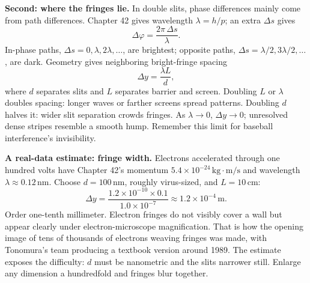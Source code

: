 \textbf{Second: where the fringes lie.} In double slits, phase differences mainly come from path differences. Chapter 42 gives wavelength \(\lambda = h/p\); an extra \(\Delta s\) gives
\[
\Delta\varphi = \frac{2\pi\,\Delta s}{\lambda}.
\]
In-phase paths, \(\Delta s = 0, \lambda, 2\lambda, \dots\), are brightest; opposite paths, \(\Delta s = \lambda/2, 3\lambda/2, \dots\), are dark. Geometry gives neighboring bright-fringe spacing
\[
\Delta y = \frac{\lambda L}{d},
\]
where \(d\) separates slits and \(L\) separates barrier and screen. Doubling \(L\) or \(\lambda\) doubles spacing: longer waves or farther screens spread patterns. Doubling \(d\) halves it: wider slit separation crowds fringes. As \(\lambda \to 0\), \(\Delta y \to 0\); unresolved dense stripes resemble a smooth hump. Remember this limit for baseball interference's invisibility.

\textbf{A real-data estimate: fringe width.} Electrons accelerated through one hundred volts have Chapter 42's momentum \(5.4\times10^{-24}\,\mathrm{kg\cdot m/s}\) and wavelength \(\lambda \approx 0.12\,\mathrm{nm}\). Choose \(d = 100\,\mathrm{nm}\), roughly virus-sized, and \(L = 10\,\mathrm{cm}\):
\[
\Delta y = \frac{1.2\times10^{-10}\times0.1}{1.0\times10^{-7}} \approx 1.2\times10^{-4}\,\mathrm{m}.
\]
Order one-tenth millimeter. Electron fringes do not visibly cover a wall but appear clearly under electron-microscope magnification. That is how the opening image of tens of thousands of electrons weaving fringes was made, with Tonomura's team producing a textbook version around 1989. The estimate exposes the difficulty: \(d\) must be nanometric and the slits narrower still. Enlarge any dimension a hundredfold and fringes blur together.


